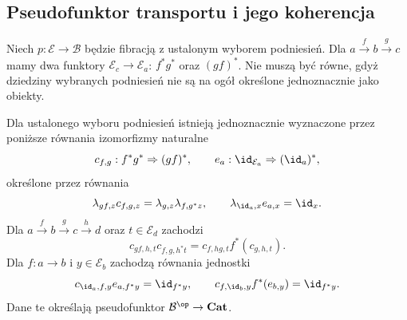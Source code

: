 \subsection{Pseudofunktor transportu i jego koherencja}

Niech $p:\mathcal E\to\mathcal B$ będzie fibracją z ustalonym wyborem podniesień. Dla $a\xrightarrow{f}b\xrightarrow{g}c$ mamy dwa funktory $\mathcal E_c\to\mathcal E_a$: $f^*g^*$ oraz $(gf)^*$. Nie muszą być równe, gdyż dziedziny wybranych podniesień nie są na ogół określone jednoznacznie jako obiekty.

\begin{twierdzenie}\label{cat:thm:reindexing-pseudofunctor}
Dla ustalonego wyboru podniesień istnieją jednoznacznie wyznaczone przez poniższe równania izomorfizmy naturalne
\[
 c_{f,g}:f^*g^*\Rightarrow(gf)^*,\qquad
 e_a:\id_{\mathcal E_a}\Rightarrow(\id_a)^*,
\]
określone przez równania
\begin{equation}\label{cat:eq:transport-comparison}
 \lambda_{gf,z}c_{f,g,z}
 =\lambda_{g,z}\lambda_{f,g^*z},
 \qquad
 \lambda_{\id_a,x}e_{a,x}=\id_x.
\end{equation}
Dla $a\xrightarrow{f}b\xrightarrow{g}c\xrightarrow{h}d$ oraz $t\in\mathcal E_d$ zachodzi
\begin{equation}\label{cat:eq:transport-associativity}
 c_{gf,h,t}c_{f,g,h^*t}
 =c_{f,hg,t}f^*(c_{g,h,t}).
\end{equation}
Dla $f:a\to b$ i $y\in\mathcal E_b$ zachodzą równania jednostki
\begin{equation}\label{cat:eq:transport-units}
 c_{\id_a,f,y}e_{a,f^*y}=\id_{f^*y},
 \qquad
 c_{f,\id_b,y}f^*(e_{b,y})=\id_{f^*y}.
\end{equation}
Dane te określają pseudofunktor $\mathcal B^{\op}\to\mathbf{Cat}$.
\end{twierdzenie}
